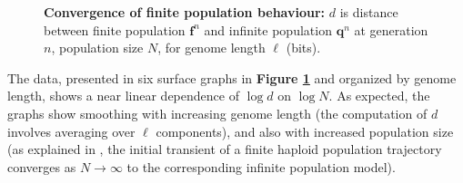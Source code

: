 \begin{figure}[htp]
\begin{center}
\hspace{5pt}
\caption[\textbf{Convergence of finite population behaviour}]{\textbf{Convergence of finite population behaviour:} $d$ is
  distance between finite population ${\bm f}^n$ and infinite
  population ${\bm q}^n$ at generation $n$, population size $N$, for
  genome length $\ell$ (bits).}
\label{convergence}
\end{center}
\end{figure}

The data, presented in six surface graphs in {\bf Figure \ref{convergence}} and organized by
genome length, shows a near linear dependence of $\log d$ on $\log N$.
As expected, the graphs show smoothing with increasing genome length
(the computation of $d$ involves averaging over $\ell$ components),
and also with increased population size (as explained in
\cite{Vose1999}, the initial transient of a finite haploid population
trajectory converges as $N \rightarrow \infty$ to the corresponding
infinite population model).

